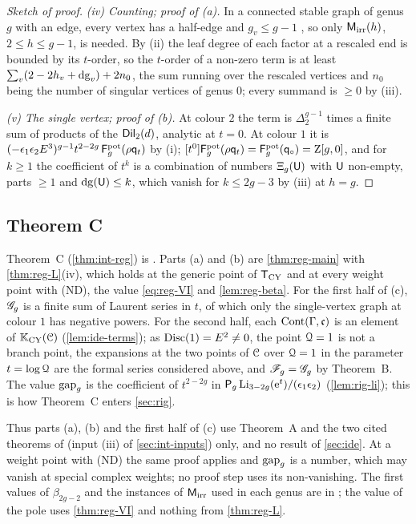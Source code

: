 \begin{proof}[Sketch of proof]
\emph{(iv) Counting; proof of (a).} In a connected stable graph of genus $g$ with an edge, every vertex has a half-edge and $g_v\leq g-1$ , so only $\mathsf{M}_{\mathrm{irr}}(h)$, $2\leq h\leq g-1$, is needed. By (ii) the leaf degree of each factor at a rescaled end is bounded by its $t$-order, so the $t$-order of a non-zero term is at least $\sum_v(2-2h_v+\mathrm{dg}_v)+2n_0$, the sum running over the rescaled vertices and $n_0$ being the number of singular vertices of genus $0$; every summand is $\geq0$ by (iii).

\emph{(v) The single vertex; proof of (b).} At colour $2$ the term is $\Delta_2^{g-1}$ times a finite sum of products of the $\mathsf{Dil}_2(d)$, analytic at $t=0$. At colour $1$ it is $(-\epsilon_1\epsilon_2E^3)^{g-1}t^{2-2g}\,\mathsf{F}^{\mathrm{pot}}_g(\rho\mathsf{q}_{t})$ by (i); $[t^0]\mathsf{F}^{\mathrm{pot}}_g(\rho\mathsf{q}_{t})=\mathsf{F}^{\mathrm{pot}}_g(\mathsf{q}_{\circ})=\mathrm{Z}[g,0]$, and for $k\geq1$ the coefficient of $t^k$ is a combination of numbers $\Xi_g(\mathsf{U})$ with $\mathsf{U}$ non-empty, parts $\geq1$ and $\mathrm{dg}(\mathsf{U})\leq k$, which vanish for $k\leq2g-3$ by (iii) at $h=g$.
\end{proof}

\subsection{Theorem C}
\label{sec:reg-thmC}

Theorem~C (\cref{thm:int-reg}) is . Parts (a) and (b) are \cref{thm:reg-main} with \cref{thm:reg-L}(iv), which holds at the generic point of $\mathsf{T}_{\mathrm{CY}}$ and at every weight point with (ND), the value \eqref{eq:reg-VI} and \cref{lem:reg-beta}. For the first half of (c), $\mathscr{G}_g$ is a finite sum of Laurent series in $t$, of which only the single-vertex graph at colour $1$ has negative powers. For the second half, each $\mathrm{Cont}(\Gamma,\mathfrak{c})$ is an element of $\mathbb{K}_{\mathrm{CY}}(\mathcal{C})$ (\cref{lem:ide-terms}); as $\operatorname{Disc}(1)=E^2\neq0$, the point $\mathcal{Q}=1$ is not a branch point, the expansions at the two points of $\mathcal{C}$ over $\mathcal{Q}=1$ in the parameter $t=\log\mathcal{Q}$ are the formal series considered above, and $\mathscr{F}_g=\mathscr{G}_g$ by Theorem~B. The value $\mathrm{gap}_g$ is the coefficient of $t^{2-2g}$ in $\mathsf{P}_{g}\operatorname{Li}_{3-2g}(\mathrm{e}^t)/(\epsilon_1\epsilon_2)$ (\cref{lem:rig-li}); this is how Theorem~C enters \cref{sec:rig}.

Thus parts (a), (b) and the first half of (c) use Theorem~A and the two cited theorems of \cite{LP2} (input (iii) of \cref{sec:int-inputs}) only, and no result of \cref{sec:ide}. At a weight point with (ND) the same proof applies  and $\mathrm{gap}_g$ is a number, which may vanish at special complex weights; no proof step uses its non-vanishing. The first values of $\beta_{2g-2}$ and the instances of $\mathsf{M}_{\mathrm{irr}}$ used in each genus are in ; the value of the pole uses \cref{thm:reg-VI} and nothing from \cref{thm:reg-L}.
